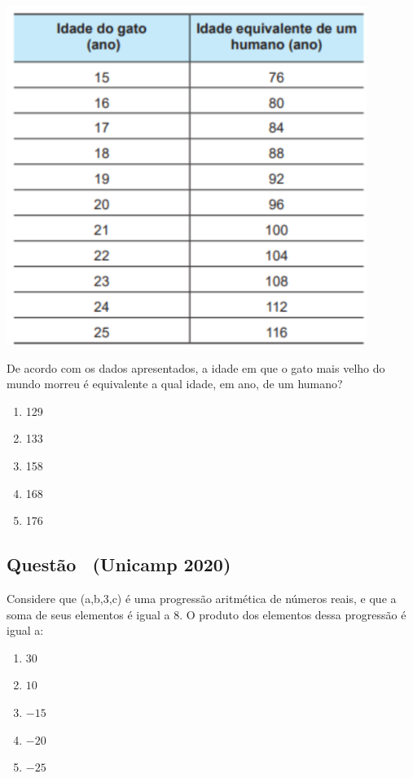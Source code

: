 \documentclass[12pt]{article}
\newif\ifmostravermelho
\newcommand{\vermelho}[1]{%
  \ifmostravermelho
    {\color{red}#1}%
  \else
    #1%
  \fi
}
\newcounter{questao}
\newcommand{\novaquestao}[1]{%
  \stepcounter{questao}%
  \subsection*{Questão \thequestao\ (#1)}%
}
\begin{document}
\begin{multicols}{2}
            \begin{center}
                \includegraphics[scale=0.6]{q30.png}
            \end{center}De acordo com os dados apresentados, a idade em que o gato mais velho do mundo morreu é equivalente a qual idade, em ano, de um humano?

            \begin{enumerate}[label=(\alph*), noitemsep]
                \item 129
                \item 133
                \item 158
                \item 168
                \item 176
            \end{enumerate}

        \novaquestao{Unicamp 2020}
            Considere que (a,b,3,c) é uma progressão aritmética de números reais, e que a soma de seus elementos é igual a 8. O produto dos elementos dessa progressão é igual a:

            \begin{enumerate}[label=(\alph*), noitemsep]
                \item $30$
                \item $10$
                \item \vermelho{$-15$} %
                \item $-20$
                \item $-25$
            \end{enumerate}


\end{multicols}
\end{document}
